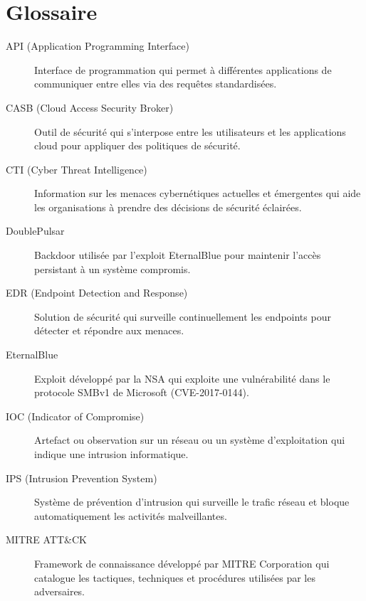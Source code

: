 \chapter*{Glossaire}

\begin{description}

    \item[API (Application Programming Interface)]
          Interface de programmation qui permet à différentes applications de communiquer entre elles via des requêtes standardisées.

    \item[CASB (Cloud Access Security Broker)]
          Outil de sécurité qui s'interpose entre les utilisateurs et les applications cloud pour appliquer des politiques de sécurité.

    \item[CTI (Cyber Threat Intelligence)]
          Information sur les menaces cybernétiques actuelles et émergentes qui aide les organisations à prendre des décisions de sécurité éclairées.

    \item[DoublePulsar]
          Backdoor utilisée par l'exploit EternalBlue pour maintenir l'accès persistant à un système compromis.

    \item[EDR (Endpoint Detection and Response)]
          Solution de sécurité qui surveille continuellement les endpoints pour détecter et répondre aux menaces.

    \item[EternalBlue]
          Exploit développé par la NSA qui exploite une vulnérabilité dans le protocole SMBv1 de Microsoft (CVE-2017-0144).

    \item[IOC (Indicator of Compromise)]
          Artefact ou observation sur un réseau ou un système d'exploitation qui indique une intrusion informatique.

    \item[IPS (Intrusion Prevention System)]
          Système de prévention d'intrusion qui surveille le trafic réseau et bloque automatiquement les activités malveillantes.

    \item[MITRE ATT\&CK]
          Framework de connaissance développé par MITRE Corporation qui catalogue les tactiques, techniques et procédures utilisées par les adversaires.


\end{description}
